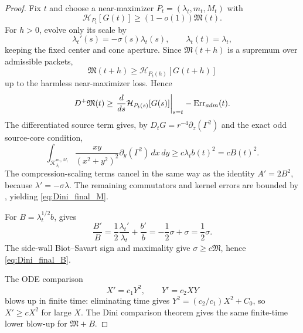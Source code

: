 \documentclass[10pt,a4paper]{amsart}
\begin{document}
\begin{proof}
Fix \(t\) and choose a near-maximizer \(P_t=(\lambda_t,m_t,M_t)\) with
\[
\mathcal H_{P_t}[G(t)]\ge (1-o(1))\mathfrak M(t).
\]
For \(h>0\), evolve only its scale by
\[
\lambda_t'(s)=-\sigma(s)\lambda_t(s),
\qquad
\lambda_t(t)=\lambda_t,
\]
keeping the fixed center and cone aperture.  Since \(\mathfrak M(t+h)\) is a supremum over admissible packets,
\[
\mathfrak M(t+h)\ge \mathcal H_{P_t(h)}[G(t+h)]
\]
up to the harmless near-maximizer loss.  Hence
\[
D^+\mathfrak M(t)
\ge
\left.\frac d{ds}\mathcal H_{P_t(s)}[G(s)]\right|_{s=t}
-
\operatorname{Err}_{\rm adm}(t).
\]
The differentiated source term gives, by \(D_tG=r^{-4}\partial_z(\Gamma^2)\) and the exact odd source-core condition,
\[
\int_{\mathcal K_{\lambda_t}^{m_t,M_t}}
\frac{xy}{(x^2+y^2)^2}\partial_y(\Gamma^2)\,dx\,dy
\ge c\lambda_t b(t)^2=cB(t)^2.
\]
The compression-scaling terms cancel in the same way as the identity \(A'=2B^2\), because \(\lambda'=-\sigma\lambda\).  The remaining commutators and kernel errors are bounded by , yielding \eqref{eq:Dini_final_M}.

For \(B=\lambda_t^{1/2}b\),  gives
\[
\frac{B'}{B}=\frac12\frac{\lambda_t'}{\lambda_t}+\frac{b'}b
=-\frac12\sigma+\sigma=\frac12\sigma.
\]
The side-wall Biot--Savart sign and maximality give \(\sigma\ge c\mathfrak M\), hence \eqref{eq:Dini_final_B}.

The ODE comparison
\[
X'=c_1Y^2,
\qquad
Y'=c_2XY
\]
blows up in finite time: eliminating time gives \(Y^2=(c_2/c_1)X^2+C_0\), so \(X'\ge cX^2\) for large \(X\).  The Dini comparison theorem gives the same finite-time lower blow-up for \(\mathfrak M+B\).
\end{proof}
\end{document}
